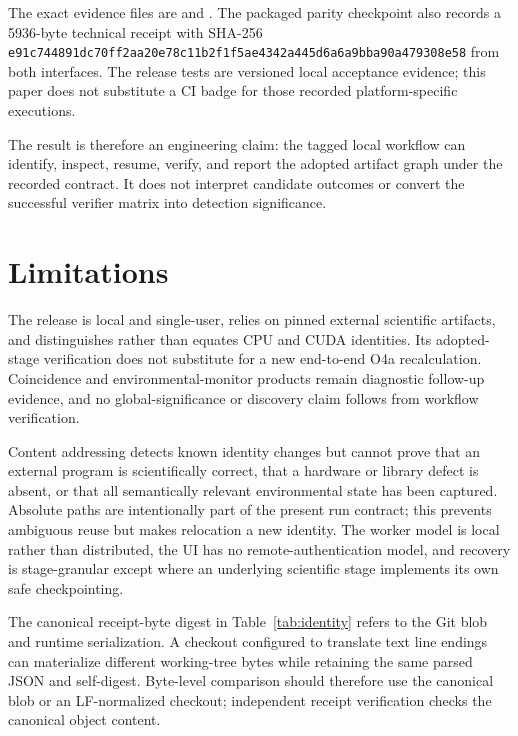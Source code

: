 \documentclass[aps,prd,twocolumn,superscriptaddress,nofootinbib,amsmath,amssymb,floatfix,10pt]{revtex4-2}
\begin{document}
The exact evidence files are
 and
.  The packaged parity
checkpoint also records a 5936-byte technical receipt with
SHA-256
\nolinkurl{e91c744891dc70ff2aa20e78c11b2f1f5ae4342a445d6a6a9bba90a479308e58}
from both interfaces.  The release tests are versioned local acceptance
evidence; this paper does not substitute a CI badge for those recorded
platform-specific executions.

The result is therefore an engineering claim: the tagged local workflow can
identify, inspect, resume, verify, and report the adopted artifact graph under
the recorded contract.  It does not interpret candidate outcomes or convert
the successful verifier matrix into detection significance.

\section{Limitations}
\label{sec:limitations}

The release is local and single-user, relies on pinned external scientific
artifacts, and distinguishes rather than equates CPU and CUDA identities.  Its
adopted-stage verification does not substitute for a new end-to-end O4a
recalculation.  Coincidence and environmental-monitor products remain
diagnostic follow-up evidence, and no global-significance or discovery claim
follows from workflow verification.

Content addressing detects known identity changes but cannot prove that an
external program is scientifically correct, that a hardware or library defect
is absent, or that all semantically relevant environmental state has been
captured.  Absolute paths are intentionally part of the present run contract;
this prevents ambiguous reuse but makes relocation a new identity.  The worker
model is local rather than distributed, the UI has no remote-authentication
model, and recovery is stage-granular except where an underlying scientific
stage implements its own safe checkpointing.

The canonical receipt-byte digest in Table~\ref{tab:identity} refers to the Git
blob and runtime serialization.  A checkout configured to translate text line
endings can materialize different working-tree bytes while retaining the same
parsed JSON and self-digest.  Byte-level comparison should therefore use the
canonical blob or an LF-normalized checkout; independent receipt verification
checks the canonical object content.
\end{document}
